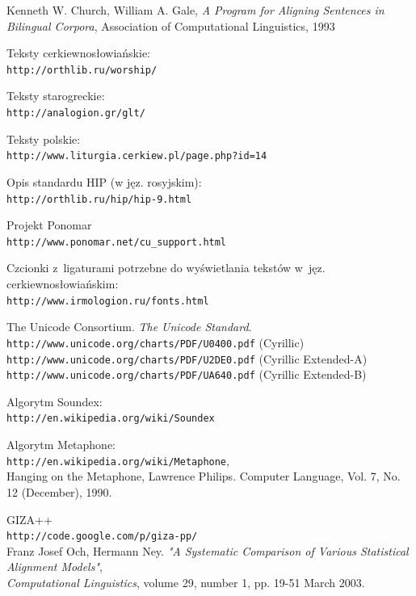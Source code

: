 \documentclass{pracamgr}
\begin{document}

\begin{thebibliography}{99}

 Kenneth W. Church, William A. Gale, \textit{A
  Program for Aligning Sentences in Bilingual Corpora}, Association of
  Computational Linguistics, 1993

 Teksty cerkiewno\-{}słowiańskie:\\
  {\tt http://orthlib.ru/worship/}

 Teksty starogreckie:\\
  {\tt http://analogion.gr/glt/}

 Teksty polskie:\\
  {\tt http://www.liturgia.cerkiew.pl/page.php?id=14}

 Opis standardu HIP (w jęz. rosyjskim):\\
  {\tt http://orthlib.ru/hip/hip-9.html}

 Projekt Ponomar \\
  {\tt http://www.ponomar.net/cu\_support.html}

 Czcionki z~ligaturami potrzebne do wyświetlania
  tekstów w~jęz. cerkiewno\-{}słowiańskim:\\
  {\tt http://www.irmologion.ru/fonts.html}

  The Unicode Consortium. \textit{The Unicode Standard}.\\
  {\tt http://www.unicode.org/charts/PDF/U0400.pdf} (Cyrillic)\\
  {\tt http://www.unicode.org/charts/PDF/U2DE0.pdf} (Cyrillic Extended-A)\\
  {\tt http://www.unicode.org/charts/PDF/UA640.pdf} (Cyrillic Extended-B)

 Algorytm Soundex:\\
  {\tt http://en.wikipedia.org/wiki/Soundex}

 Algorytm Metaphone:\\
  {\tt http://en.wikipedia.org/wiki/Metaphone},\\
  Hanging on the Metaphone, Lawrence Philips. Computer Language,
  Vol. 7, No. 12 (December), 1990.

 GIZA++\\
  {\tt http://code.google.com/p/giza-pp/}\\
  Franz Josef Och, Hermann Ney. \textit{"A Systematic Comparison of
  Various Statistical Alignment Models"},\\ \textit{Computational
  Linguistics}, volume 29, number 1, pp. 19-51 March 2003.


\end{thebibliography}
\end{document}
